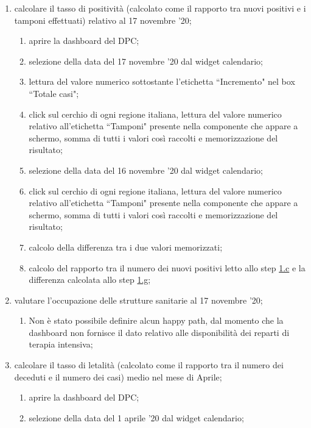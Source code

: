 \begin{enumerate}
    \item calcolare il tasso di positività (calcolato come il rapporto tra nuovi positivi e i tamponi effettuati) relativo al 17 novembre '20;    
    \begin{enumerate}[label=\alph*.]
        \item aprire la dashboard del DPC;
        \item selezione della data del 17 novembre '20 dal widget calendario;
        \item lettura del valore numerico sottostante l'etichetta ``Incremento" nel box ``Totale casi";\label{ta:c}
        \item click sul cerchio di ogni regione italiana, lettura del valore numerico relativo all'etichetta ``Tamponi" presente nella componente che appare a schermo, somma di tutti i valori così raccolti e memorizzazione del risultato;
        \item selezione della data del 16 novembre '20 dal widget calendario;
        \item click sul cerchio di ogni regione italiana, lettura del valore numerico relativo all'etichetta ``Tamponi" presente nella componente che appare a schermo, somma di tutti i valori così raccolti e memorizzazione del risultato;
        \item calcolo della differenza tra i due valori memorizzati;\label{ta:g}
        \item calcolo del rapporto tra il numero dei nuovi positivi letto allo step \hyperref[ta:c]{1.c} e la differenza calcolata allo step \hyperref[ta:g]{1.g};
    \end{enumerate}
    \item valutare l'occupazione delle strutture sanitarie al 17 novembre '20;
    \begin{enumerate}[label=\alph*.]
        \item  Non è stato possibile definire alcun happy path, dal momento che la dashboard non fornisce il dato relativo alle disponibilità dei reparti di terapia intensiva;
    \end{enumerate}
    \item calcolare il tasso di letalità (calcolato come il rapporto tra il numero dei deceduti e il numero dei casi) medio nel mese di Aprile;
    \begin{enumerate}[label=\alph*.]
        \item aprire la dashboard del DPC;
        \item selezione della data del 1 aprile '20 dal widget calendario;

\end{enumerate}
\end{enumerate}
